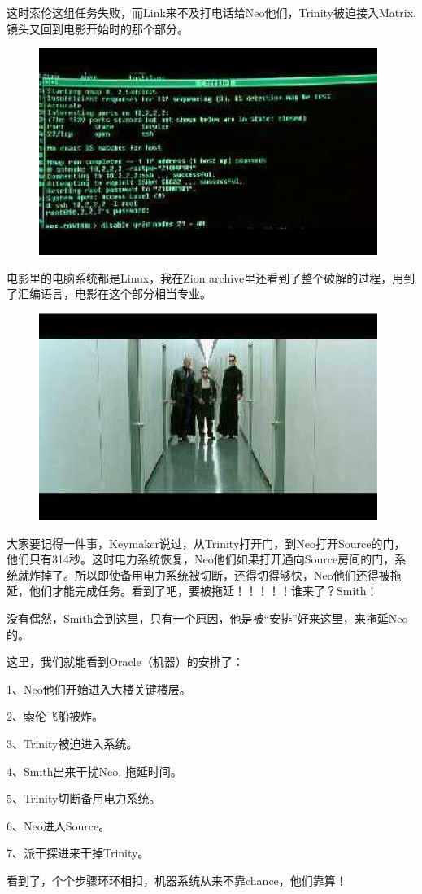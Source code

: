 \documentclass[UTF8]{ctexart}
\begin{document}
这时索伦这组任务失败，而Link来不及打电话给Neo他们，Trinity被迫接入Matrix. 镜头又回到电影开始时的那个部分。

\begin{figure}[htb]
\centering
\includegraphics[width=0.5\linewidth]{fig/read_reloaded-151}
\end{figure}

电影里的电脑系统都是Linux，我在Zion archive里还看到了整个破解的过程，用到了汇编语言，电影在这个部分相当专业。

\begin{figure}[htb]
\centering
\includegraphics[width=0.5\linewidth]{fig/read_reloaded-152}
\end{figure}

大家要记得一件事，Keymaker说过，从Trinity打开门，到Neo打开Source的门，他们只有314秒。这时电力系统恢复，Neo他们如果打开通向Source房间的门，系统就炸掉了。所以即使备用电力系统被切断，还得切得够快，Neo他们还得被拖延，他们才能完成任务。看到了吧，要被拖延！！！！！谁来了？Smith！

没有偶然，Smith会到这里，只有一个原因，他是被“安排”好来这里，来拖延Neo的。

这里，我们就能看到Oracle（机器）的安排了：

1、Neo他们开始进入大楼关键楼层。

2、索伦飞船被炸。

3、Trinity被迫进入系统。

4、Smith出来干扰Neo, 拖延时间。

5、Trinity切断备用电力系统。

6、Neo进入Source。

7、派干探进来干掉Trinity。

看到了，个个步骤环环相扣，机器系统从来不靠chance，他们靠算！
\end{document}
